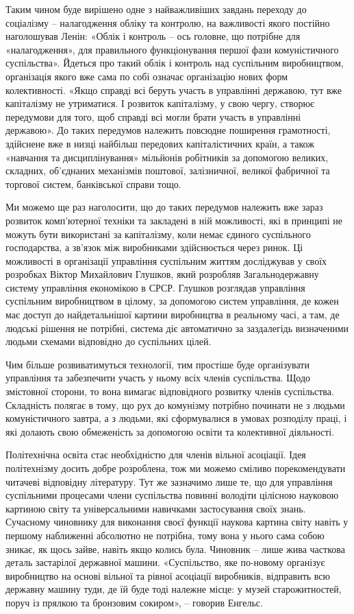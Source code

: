 \documentclass[12pt,a4paper,openany]{book}
\begin{document}
Таким чином буде вирішено одне з найважливіших завдань переходу до соціалізму – налагодження обліку та контролю, на важливості якого постійно наголошував Ленін: «Облік і контроль – ось головне, що потрібне для «налагодження», для правильного функціонування першої фази комуністичного суспільства». Йдеться про такий облік і контроль над суспільним виробництвом, організація якого вже сама по собі означає організацію нових форм колективності. «Якщо справді всі беруть участь в управлінні державою, тут вже капіталізму не утриматися. І розвиток капіталізму, у свою чергу, створює передумови для того, щоб справді всі могли брати участь в управлінні державою». До таких передумов належить повсюдне поширення грамотності, здійснене вже в низці найбільш передових капіталістичних країн, а також «навчання та дисциплінування» мільйонів робітників за допомогою великих, складних, об’єднаних механізмів поштової, залізничної, великої фабричної та торгової систем, банківської справи тощо.

Ми можемо ще раз наголосити, що до таких передумов належить вже зараз розвиток комп’ютерної техніки та закладені в ній можливості, які в принципі не можуть бути використані за капіталізму, коли немає єдиного суспільного господарства, а зв’язок між виробниками здійснюється через ринок. Ці можливості в організації управління суспільним життям досліджував у своїх розробках Віктор Михайлович Глушков, який розробляв Загальнодержавну систему управління економікою в СРСР. Глушков розглядав управління суспільним виробництвом в цілому, за допомогою систем управління, де кожен має доступ до найдетальнішої картини виробництва в реальному часі, а там, де людські рішення не потрібні, система діє автоматично за заздалегідь визначеними людьми схемами відповідно до суспільних цілей.

Чим більше розвиватимуться технології, тим простіше буде організувати управління та забезпечити участь у ньому всіх членів суспільства. Щодо змістовної сторони, то вона вимагає відповідного розвитку членів суспільства. Складність полягає в тому, що рух до комунізму потрібно починати не з людьми комуністичного завтра, а з людьми, які сформувалися в умовах розподілу праці, і які долають свою обмеженість за допомогою освіти та колективної діяльності.

Політехнічна освіта стає необхідністю для членів вільної асоціації. Ідея політехнізму досить добре розроблена, тож ми можемо сміливо порекомендувати читачеві відповідну літературу. Тут же зазначимо лише те, що для управління суспільними процесами члени суспільства повинні володіти цілісною науковою картиною світу та універсальними навичками застосування своїх знань. Сучасному чиновнику для виконання своєї функції наукова картина світу навіть у першому наближенні абсолютно не потрібна, тому вона у нього сама собою зникає, як щось зайве, навіть якщо колись була. Чиновник – лише жива часткова деталь застарілої державної машини. «Суспільство, яке по-новому організує виробництво на основі вільної та рівної асоціації виробників, відправить всю державну машину туди, де їй буде тоді належне місце: у музей старожитностей, поруч із прялкою та бронзовим сокиром», – говорив Енгельс.
\end{document}
